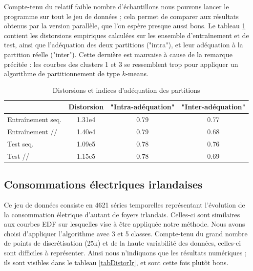 \documentclass[12pt]{article}
\begin{document}
Compte-tenu du relatif faible nombre d'échantillons nous pouvons lancer le programme sur tout le jeu de données ; 
cela permet de comparer aux résultats obtenus par la version parallèle, que l'on espère presque aussi bons. 
Le tableau \ref{tabDistorSl} contient les distorsions empiriques calculées sur les ensemble d'entraînement et de test, 
ainsi que l'adéquation des deux partitions ("intra"), et leur adéquation à la partition réelle ("inter"). Cette dernière est mauvaise à cause de la remarque précitée :
les courbes des clusters 1 et 3 se ressemblent trop pour appliquer un algorithme de partitionnement de type $k$-means.\\

\begin{table}[H]
\centering
\begin{tabular}{|l|c|c|c|}
\hline
 & Distorsion & "Intra-adéquation" & "Inter-adéquation" \\
\hline
Entraînement seq. & 1.31e4 & 0.79 & 0.77\\
\hline
Entraînement // & 1.40e4 & 0.79 & 0.68\\
\hline
Test seq. & 1.09e5 & 0.78 & 0.76\\
\hline
Test // & 1.15e5 & 0.78 & 0.69\\
\hline
\end{tabular}
\caption{Distorsions et indices d'adéquation des partitions}
\label{tabDistorSl}
\end{table}


\subsection{Consommations électriques irlandaises}

Ce jeu de données consiste en 4621 séries temporelles représentant l'évolution de la consommation életrique d'autant de foyers irlandais. 
Celles-ci sont similaires aux courbes EDF sur lesquelles vise à être appliquée notre méthode. 
Nous avons choisi d'appliquer l'algorithme avec 3 et 5 classes. Compte-tenu du grand nombre de points de discrétisation (25k) 
et de la haute variabilité des données, celles-ci sont difficiles à représenter. Ainsi nous n'indiquons que les résultats numériques ; 
ils sont visibles dans le tableau \ref{tabDistorIr}, et sont cette fois plutôt bons.\\
\end{document}
